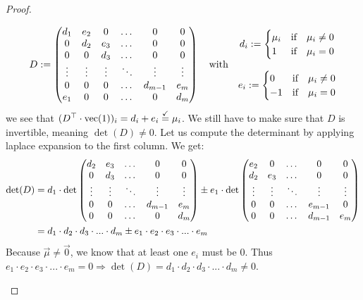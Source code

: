 \begin{proof}
\begin{enumerate}
        $$D := \left(\begin{matrix}
            d_1 & e_2 & 0 & \dots & 0 & 0\\
            0 & d_2 & e_3 & \dots & 0 & 0\\
            0 & 0 & d_3 & \dots & 0 & 0\\
            \vdots & \vdots & \vdots & \ddots & \vdots & \vdots\\
            0 & 0 & 0 & \dots & d_{m-1} & e_m\\
            e_1 & 0 & 0 & \dots & 0 & d_m
        \end{matrix}\right) \quad\textrm{with}\quad 
        \begin{matrix}
            d_i := \begin{cases}
                \mu_i &\textrm{if}\quad \mu_i \neq 0\\
                1 &\textrm{if}\quad \mu_i = 0
            \end{cases}\\\\
            e_i := \begin{cases}
                0 &\textrm{if}\quad \mu_i \neq 0\\
                -1 &\textrm{if}\quad \mu_i = 0
            \end{cases}
        \end{matrix}$$
        we see that $(D^\top \cdot \operatorname{vec}(1))_i = d_i + e_i \stackrel{\checkmark}{=} \mu_i$. We still have to make sure that $D$ is invertible, meaning $\det(D) \neq 0$. Let us compute the determinant by applying laplace expansion to the first column. We get:
        \begin{align*}  
            \det(D) &= d_1 \cdot \det\left(\begin{matrix}
                d_2 & e_3 & \dots & 0 & 0\\
                0 & d_3 & \dots & 0 & 0\\
                \vdots & \vdots & \ddots & \vdots& \vdots\\
                0 & 0 & \dots & d_{m-1} & e_m\\
                0 & 0 & \dots & 0 & d_m
            \end{matrix}\right) \pm e_1 \cdot \det\left(\begin{matrix}
                e_2 & 0 & \dots & 0 & 0\\
                d_2 & e_3 & \dots & 0 & 0\\
                \vdots & \vdots & \ddots & \vdots& \vdots\\
                0 & 0 & \dots & e_{m-1} & 0\\
                0 & 0 & \dots & d_{m-1} & e_m
            \end{matrix}\right)\\
            &= d_1 \cdot d_2 \cdot d_3 \cdot ... \cdot d_m \pm e_1 \cdot e_2 \cdot e_3 \cdot ... \cdot e_m 
        \end{align*}
        Because $\vec\mu \neq \vec0$, we know that at least one $e_i$ must be 0. Thus $e_1 \cdot e_2 \cdot e_3 \cdot ... \cdot e_m = 0 \Rightarrow \det(D) = d_1 \cdot d_2 \cdot d_3 \cdot ... \cdot d_m \neq 0$.


\end{enumerate}
\end{proof}
